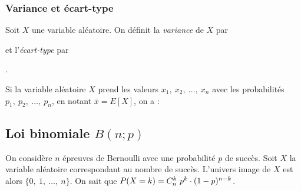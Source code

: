                         \subsubsection{Variance et \'ecart-type}
                        Soit $X$ une variable al\'eatoire.
                        On d\'efinit la \emph{variance} de $X$ par
                        \par\smallskip\noindent
                        \par\smallskip
                        et l'\emph{\'ecart-type} par
                        \par\smallskip\noindent
                        .
                        \par\smallskip
                        
                        Si la variable al\'eatoire $X$ prend les valeurs 
                        $x_1,\ x_2,\ \ldots,\ x_n$ avec les probabilit\'es 
                        $p_1,\ p_2,\ \ldots,\ p_n$, en notant $\bar{x} = E[X]$,
                        on a :
                        \par\smallskip\noindent
                        \par\smallskip
                  \subsection{Loi binomiale $B(n;p)$}
                  On consid\`ere $n$ \'epreuves de Bernoulli avec une probabilit\'e $p$ de succ\`es.
                  Soit $X$ la variable al\'eatoire correspondant au nombre de succ\`es.
                  L'univers image de $X$ est alors 
                  $\{ 0,\ 1,\ \ldots,\ n\}$.
                  On sait que $P(X = k) = C_{n}^{k}\ p^k \cdot (1-p)^{n-k}$.
                  
